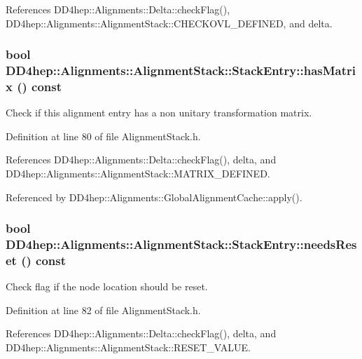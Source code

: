 References DD4hep::Alignments::Delta::checkFlag(), DD4hep::Alignments::AlignmentStack::CHECKOVL\_\-DEFINED, and delta.\hypertarget{struct_d_d4hep_1_1_alignments_1_1_alignment_stack_1_1_stack_entry_a7625b59366463484cdc705d0fad3e3f5}{
\subsubsection[{hasMatrix}]{\setlength{\rightskip}{0pt plus 5cm}bool DD4hep::Alignments::AlignmentStack::StackEntry::hasMatrix () const}}
\label{struct_d_d4hep_1_1_alignments_1_1_alignment_stack_1_1_stack_entry_a7625b59366463484cdc705d0fad3e3f5}


Check if this alignment entry has a non unitary transformation matrix. 

Definition at line 80 of file AlignmentStack.h.

References DD4hep::Alignments::Delta::checkFlag(), delta, and DD4hep::Alignments::AlignmentStack::MATRIX\_\-DEFINED.

Referenced by DD4hep::Alignments::GlobalAlignmentCache::apply().\hypertarget{struct_d_d4hep_1_1_alignments_1_1_alignment_stack_1_1_stack_entry_a6aacb14e3c417fcefca33ddc072fa00f}{
\subsubsection[{needsReset}]{\setlength{\rightskip}{0pt plus 5cm}bool DD4hep::Alignments::AlignmentStack::StackEntry::needsReset () const}}
\label{struct_d_d4hep_1_1_alignments_1_1_alignment_stack_1_1_stack_entry_a6aacb14e3c417fcefca33ddc072fa00f}


Check flag if the node location should be reset. 

Definition at line 82 of file AlignmentStack.h.

References DD4hep::Alignments::Delta::checkFlag(), delta, and DD4hep::Alignments::AlignmentStack::RESET\_\-VALUE.


